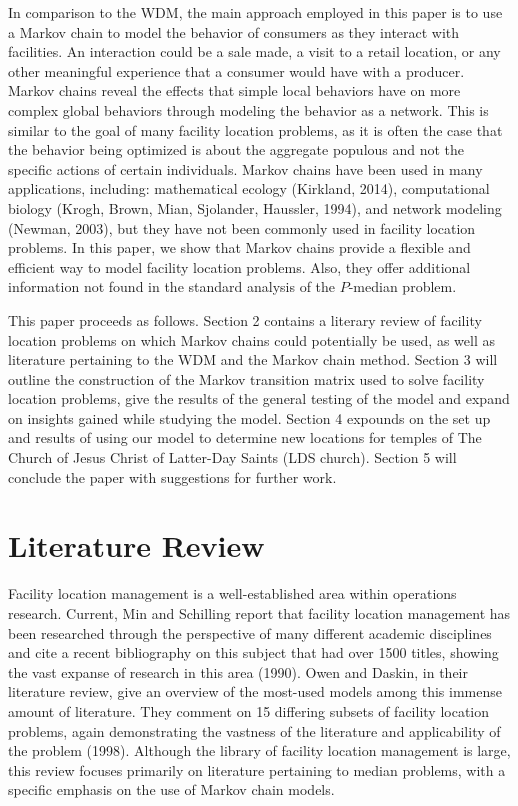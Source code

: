 \documentclass[twoside,twocolumn]{article}
\begin{document}
In comparison to the WDM, the main approach employed in this paper is to use a Markov chain to model the behavior of consumers as they interact with facilities. 
An interaction could be a sale made, a visit to a retail location, or any other meaningful experience that a consumer would have with a producer.
Markov chains reveal the effects that simple local behaviors have on more complex global behaviors through modeling the behavior as a network.
This is similar to the goal of many facility location problems, as it is often the case that the behavior being optimized is about the aggregate populous and not the specific actions of certain individuals.
Markov chains have been used in many applications, including: mathematical ecology (Kirkland, 2014), computational biology (Krogh, Brown, Mian, Sjolander, Haussler, 1994), and network modeling (Newman, 2003), but they have not been commonly used in facility location problems.
In this paper, we show that Markov chains provide a flexible and efficient way to model facility location problems.
Also, they offer additional information not found in the standard analysis of the $P$-median problem.

This paper proceeds as follows.
Section 2 contains a literary review of facility location problems on which Markov chains could potentially be used, as well as literature pertaining to the WDM and the Markov chain method. 
Section 3 will outline the construction of the Markov transition matrix used to solve facility location problems, give the results of the general testing of the model and expand on insights gained while studying the model.
Section 4 expounds on the set up and results of using our model to determine new locations for temples of The Church of Jesus Christ of Latter-Day Saints (LDS church).
Section 5 will conclude the paper with suggestions for further work.

\section{Literature Review}

Facility location management is a well-established area within operations research. %
Current, Min and Schilling report that facility location management has been researched through the perspective of many different academic disciplines and cite a recent bibliography on this subject that had over 1500 titles, showing the vast expanse of research in this area (1990). %
Owen and Daskin, in their literature review, give an overview of the most-used models among this immense amount of literature.
They comment on 15 differing subsets of facility location problems, again demonstrating the vastness of the literature and applicability of the problem (1998).
Although the library of facility location management is large, this review focuses primarily on literature pertaining to median problems, with a specific emphasis on the use of Markov chain models. %
\end{document}
